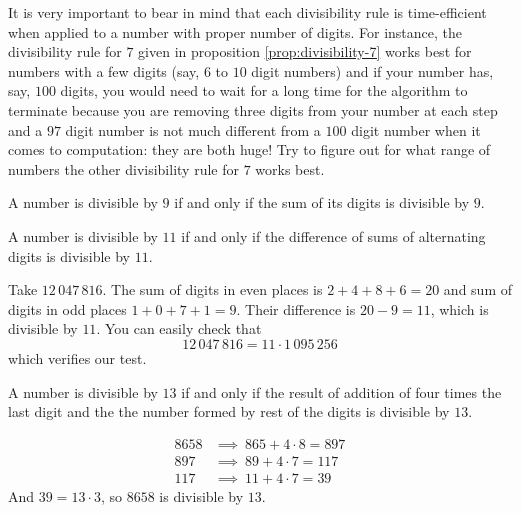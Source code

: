 \documentclass{subfile}
\begin{document}
It is very important to bear in mind that each divisibility rule is time-efficient when applied to a number with proper number of digits. For instance, the divisibility rule for $7$ given in proposition \eqref{prop:divisibility-7} works best for numbers with a few digits (say, $6$ to $10$ digit numbers) and if your number has, say, $100$ digits, you would need to wait for a long time for the algorithm to terminate because you are removing three digits from your number at each step and a $97$ digit number is not much different from a $100$ digit number when it comes to computation: they are both huge! Try to figure out for what range of numbers the other divisibility rule for $7$ works best.

	\begin{proposition}[Divisibility by $9$]
		A number is divisible by $9$ if and only if the sum of its digits is divisible by $9$.
	\end{proposition}

	\begin{proposition}[Divisibility by $11$]
		A number is divisible by $11$ if and only if the difference of sums of alternating digits is divisible by $11$.
	\end{proposition}

	\begin{example}
		Take $12 \, 047 \, 816$. The sum of digits in even places is $2+4+8+6=20$ and sum of digits in odd places $1+0+7+1=9$. Their difference is $20-9=11$, which is divisible by $11$. You can easily check that $$12 \, 047 \, 816=11\cdot1 \,095\, 256$$ which verifies our test.
	\end{example}

	\begin{proposition}[Divisibility by $13$]
		A number is divisible by $13$ if and only if the result of addition of four times the last digit and the the number formed by rest of the digits is divisible by $13$.
	\end{proposition}

	\begin{example}
		\begin{align*}
			8658 & \implies \ 865 + 4 \cdot 8 = 897 \\
			897 & \implies  \ 89 + 4 \cdot 7 =   117 \\
			117 & \implies \ 11 + 4 \cdot 7 =  39
		\end{align*}
		And $39 = 13 \cdot 3$, so $8658$ is divisible by $13$.
	\end{example}
\end{document}
